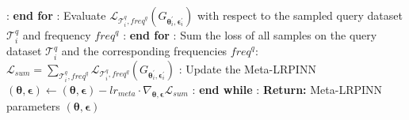 \begin{algorithm}
\begin{algorithmic}
: \quad \quad \textbf{end for}
: \quad \quad Evaluate $ \mathcal{L}_{\mathcal{T}_i^q, \textit{freq}^q}( G_{\boldsymbol{\theta}_i^{'}, \boldsymbol{\epsilon}_i^{'}})$ with respect to the sampled query dataset $\mathcal{T}_i^q$ and frequency $\textit{freq}^q$
: \quad \textbf{end for}
: \quad Sum the loss of all samples on the query dataset $\mathcal{T}_i^q$ and the corresponding frequencies $\textit{freq}^q$: \\
\quad \quad \quad \quad \quad \quad \quad \quad $\mathcal{L}_{sum} = \sum_{\mathcal{T}_i^q, \textit{freq}^q} \mathcal{L}_{\mathcal{T}_i^q, \textit{freq}^q} ( G_{{\boldsymbol{\theta}}_i^{'}, {\boldsymbol{\epsilon}}_i^{'}})$
: \quad Update the Meta-LRPINN $(\boldsymbol{\theta}, \boldsymbol{\epsilon}) \leftarrow (\boldsymbol{\theta}, \boldsymbol{\epsilon}) - lr_{meta} \cdot \nabla_{\boldsymbol{\theta}, \boldsymbol{\epsilon}} \mathcal{L}_{sum}$
: \textbf{end while}
: \textbf{Return:} Meta-LRPINN parameters $(\boldsymbol{\theta}, \boldsymbol{\epsilon})$
\end{algorithmic}
\end{algorithm}

